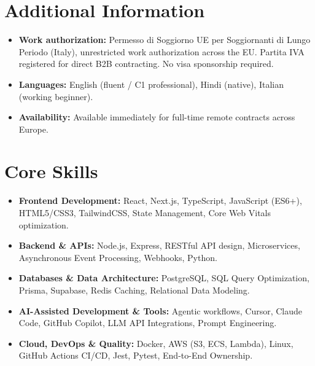 \documentclass[a4paper,10pt]{article}
\begin{document}
\section{Additional Information}
\begin{itemize}
  \item \textbf{Work authorization:} Permesso di Soggiorno UE per Soggiornanti di Lungo Periodo (Italy), unrestricted work authorization across the EU. Partita IVA registered for direct B2B contracting. No visa sponsorship required.
  \item \textbf{Languages:} English (fluent / C1 professional), Hindi (native), Italian (working beginner).
  \item \textbf{Availability:} Available immediately for full-time remote contracts across Europe.
\end{itemize}

\section{Core Skills}
\begin{itemize}
  \item \textbf{Frontend Development:} React, Next.js, TypeScript, JavaScript (ES6+), HTML5/CSS3, TailwindCSS, State Management, Core Web Vitals optimization.
  \item \textbf{Backend \& APIs:} Node.js, Express, RESTful API design, Microservices, Asynchronous Event Processing, Webhooks, Python.
  \item \textbf{Databases \& Data Architecture:} PostgreSQL, SQL Query Optimization, Prisma, Supabase, Redis Caching, Relational Data Modeling.
  \item \textbf{AI-Assisted Development \& Tools:} Agentic workflows, Cursor, Claude Code, GitHub Copilot, LLM API Integrations, Prompt Engineering.
  \item \textbf{Cloud, DevOps \& Quality:} Docker, AWS (S3, ECS, Lambda), Linux, GitHub Actions CI/CD, Jest, Pytest, End-to-End Ownership.
\end{itemize}
\end{document}
